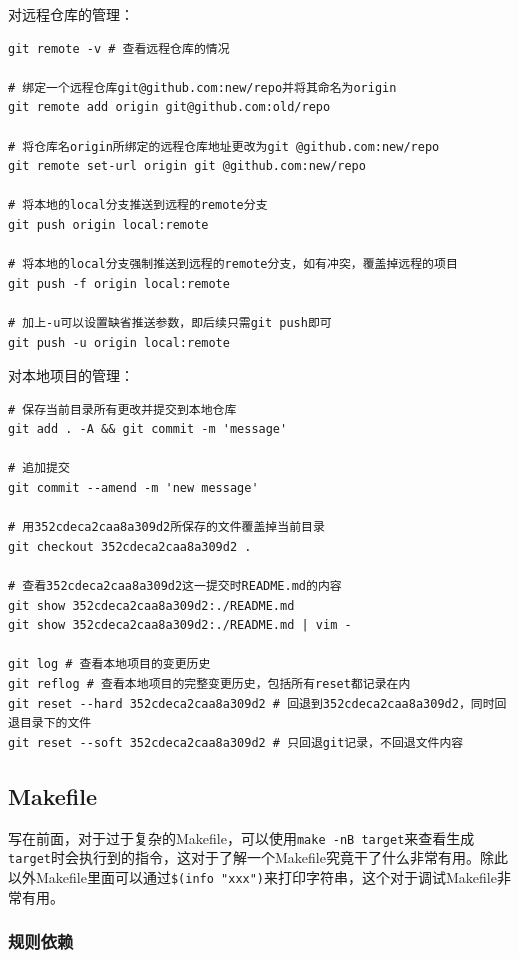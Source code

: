 \documentclass[lang=cn,11pt,a4paper]{elegantpaper}
\begin{document}
对远程仓库的管理：
\begin{lstlisting}
git remote -v # 查看远程仓库的情况

# 绑定一个远程仓库git@github.com:new/repo并将其命名为origin
git remote add origin git@github.com:old/repo

# 将仓库名origin所绑定的远程仓库地址更改为git @github.com:new/repo
git remote set-url origin git @github.com:new/repo

# 将本地的local分支推送到远程的remote分支
git push origin local:remote

# 将本地的local分支强制推送到远程的remote分支，如有冲突，覆盖掉远程的项目
git push -f origin local:remote

# 加上-u可以设置缺省推送参数，即后续只需git push即可
git push -u origin local:remote
\end{lstlisting}

对本地项目的管理：
\begin{lstlisting}
# 保存当前目录所有更改并提交到本地仓库
git add . -A && git commit -m 'message'

# 追加提交
git commit --amend -m 'new message'

# 用352cdeca2caa8a309d2所保存的文件覆盖掉当前目录
git checkout 352cdeca2caa8a309d2 .

# 查看352cdeca2caa8a309d2这一提交时README.md的内容
git show 352cdeca2caa8a309d2:./README.md
git show 352cdeca2caa8a309d2:./README.md | vim -

git log # 查看本地项目的变更历史
git reflog # 查看本地项目的完整变更历史，包括所有reset都记录在内
git reset --hard 352cdeca2caa8a309d2 # 回退到352cdeca2caa8a309d2，同时回退目录下的文件
git reset --soft 352cdeca2caa8a309d2 # 只回退git记录，不回退文件内容
\end{lstlisting}

\subsection{Makefile}\label{Makefile}

写在前面，对于过于复杂的Makefile，可以使用\lstinline!make -nB target!来查看生成\lstinline!target!时会执行到的指令，这对于了解一个Makefile究竟干了什么非常有用。除此以外Makefile里面可以通过\lstinline!$(info "xxx")!来打印字符串，这个对于调试Makefile非常有用。

\subsubsection{规则依赖}
\end{document}
